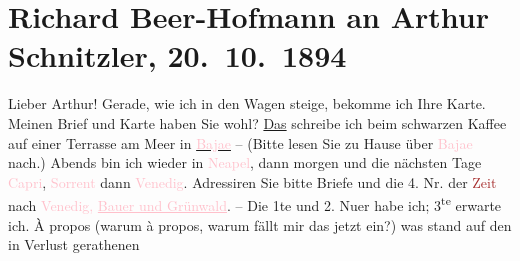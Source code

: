 

               \section[Richard Beer-Hofmann an Arthur Schnitzler, 20. 10. 1894]{ Richard Beer-Hofmann an Arthur Schnitzler, 20. 10. 1894}\nopagebreak{}\rehead{ }\normalsize\beginnumbering{} \toendnotes[C]{\smallbreak\pagebreak[2]} 
\toendnotes[C]{\smallbreak}\pstart
           \noindent{}{\pb}Lieber Arthur!
                    Gerade, wie ich in den Wagen steige, bekomme ich Ihre Karte. Meinen
                    Brief  und Karte haben Sie wohl?\pend
           \pstart
           \uline{Das}
               schreibe ich beim schwarzen Kaffee auf einer
                    Terrasse am Meer in \uline{\textcolor{pink}{Bajae}{}\ledrightnote{\textcolor{pink}{Baia}}} – (Bitte lesen Sie zu Hause über \textcolor{pink}{Bajae}{}\ledrightnote{\textcolor{pink}{Baia}}
                    nach.) Abends bin ich wieder in \textcolor{pink}{Neapel}{}\ledrightnote{\textcolor{pink}{Neapel}}, dann
                    morgen und die nächsten Tage \textcolor{pink}{Capri}{}\ledrightnote{\textcolor{pink}{Capri}},
                        \textcolor{pink}{Sorrent}{}\ledrightnote{\textcolor{pink}{Sorrent}} dann \textcolor{pink}{Venedig}{}\ledrightnote{\textcolor{pink}{Venedig}}. Adressiren Sie bitte Briefe und die 4. Nr. der
                        \textcolor{brown}{Zeit}{}\ledrightnote{\textcolor{brown}{Die Zeit. Wiener Wochenschrift}} nach \textcolor{pink}{Venedig,
                            \uline{Bauer und Grünwald}}{}\ledrightnote{\textcolor{pink}{Grand Hotel Bauer-Grünwald}}. – Die 1te und 2. Nu{\geminationm}er habe ich; 3\textsuperscript{te} erwarte ich. {\pb}À propos (warum à propos,
                    warum fällt mir das jetzt ein?) was stand auf den in Verlust gerathenen
